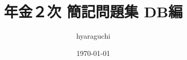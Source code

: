 \documentclass[10pt]{jsarticle}%
\begin{document}
\title{年金２次 \; 簡記問題集 \; DB編}
\author{hyaraguchi}
\date{\today}
\maketitle


\tableofcontents%

\newpage










\begin{comment}
\newpage

\begin{thebibliography}{1}%
  \bibitem[過去問]{過去問} 公益社団法人 日本アクチュアリー会 資格試験過去問題集 \url{https://www.actuaries.jp/lib/collection/} (最終閲覧日：2023/12/10)
  \bibitem[教科書]{教科書} 日本アクチュアリー会『損保数理』(日本アクチュアリー会, 2011)
  \bibitem[モデリング]{モデリング} 日本アクチュアリー会『モデリング』(日本アクチュアリー会, 2005)
  \bibitem[リスク・セオリー]{リスク・セオリー} 岩沢宏和『リスク・セオリーの基礎』(培風館, 2010)
  \bibitem[アク数学シリーズ]{アク数学シリーズ} 岩沢宏和, 黒田耕嗣『アクチュアリー数学シリーズ4 損害保険数理』(日本評論社, 2015)
  \bibitem[ストラテジー]{ストラテジー} MAH, 平井卓也, 玉岡一史『アクチュアリー試験 合格へのストラテジー 損保数理』(東京図書, 2019)
  \bibitem[例題で学ぶ]{例題で学ぶ} 小暮雅一, 東出純『例題で学ぶ損害保険数理 第2版』(共立出版, 2016)
  \bibitem[難問題の系統]{難問題の系統}CAR他「難問題の系統とその解き方 損保数理」\url{}(最終閲覧日：2023/12/10)
  \bibitem[弱点克服]{弱点克服} 藤田岳彦『弱点克服 大学生の確率・統計』(東京図書, 2010)
  \bibitem[数研微積分]{数研微積分} 加藤文元『大学教養 微分積分』(数研出版, 2019)
\end{thebibliography}
\end{comment}
\end{document}
